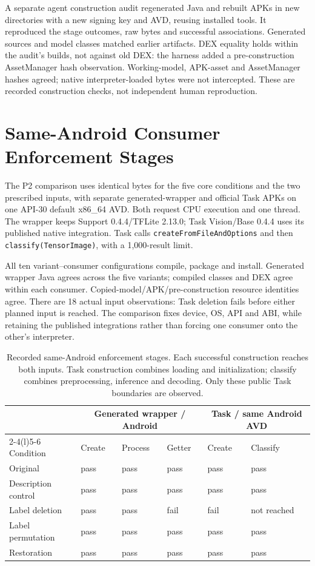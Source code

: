 \documentclass[10pt,conference]{IEEEtran}
\newcommand{\code}[1]{\texttt{#1}}
\begin{document}
A separate agent construction audit regenerated Java and rebuilt APKs in new directories with a new signing key and AVD, reusing installed tools. It reproduced the stage outcomes, raw bytes and successful associations. Generated sources and model classes matched earlier artifacts. DEX equality holds within the audit's builds, not against old DEX: the harness added a pre-construction AssetManager hash observation. Working-model, APK-asset and AssetManager hashes agreed; native interpreter-loaded bytes were not intercepted. These are recorded construction checks, not independent human reproduction.

\section{Same-Android Consumer Enforcement Stages}
\label{sec:consumers}
The P2 comparison uses identical bytes for the five core conditions and the two prescribed inputs, with separate generated-wrapper and official Task APKs on one API-30 default x86\_64 AVD. Both request CPU execution and one thread. The wrapper keeps Support 0.4.4/TFLite 2.13.0; Task Vision/Base 0.4.4 uses its published native integration. Task calls \code{createFromFileAndOptions} and then \code{classify(TensorImage)}, with a 1,000-result limit.

All ten variant--consumer configurations compile, package and install. Generated wrapper Java agrees across the five variants; compiled classes and DEX agree within each consumer. Copied-model/APK/pre-construction resource identities agree. There are 18 actual input observations: Task deletion fails before either planned input is reached. The comparison fixes device, OS, API and ABI, while retaining the published integrations rather than forcing one consumer onto the other's interpreter.

\begin{table}[t]
\caption{Recorded same-Android enforcement stages. Each successful construction reaches both inputs. Task construction combines loading and initialization; classify combines preprocessing, inference and decoding. Only these public Task boundaries are observed.}
\label{tab:stages}
\centering\small
\setlength{\tabcolsep}{9pt}
\begin{tabular}{@{}llllll@{}}
\toprule
 & \multicolumn{3}{c}{Generated wrapper / Android} & \multicolumn{2}{c}{Task / same Android AVD}\\
\cmidrule(lr){2-4}\cmidrule(l){5-6}
Condition & Create & Process & Getter & Create & Classify\\
\midrule
Original & pass & pass & pass & pass & pass\\
Description control & pass & pass & pass & pass & pass\\
Label deletion & pass & pass & fail & fail & not reached\\
Label permutation & pass & pass & pass & pass & pass\\
Restoration & pass & pass & pass & pass & pass\\
\bottomrule
\end{tabular}
\end{table}
\end{document}
